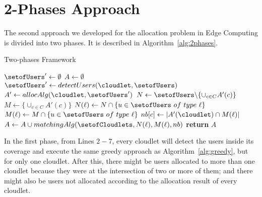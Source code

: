 \documentclass[English]{ic-tese-v3}
\begin{document}
\section{2-Phases Approach}
\label{sec:two_phases}
The second approach we developed for the allocation problem in Edge Computing is divided into two phases. It is described in Algorithm~\ref{alg:2phases}.
\algrenewcommand{}
\begin{algorithm}
    \caption{Two-phases Framework}\label{alg:2phases}
    {\fontsize{8}{8}\selectfont
        \begin{algorithmic}[1]
            \State $\setofUsers' \gets \emptyset$ \hspace{0.5cm} 
            \State $A \gets \emptyset$ \hspace{0.5cm} 
            \For{$\cloudlet \in \setofCloudlets$}
                \State $\setofUsers' \gets  detectUsers(\cloudlet, \setofUsers)$ 
                \State $A' \gets allocAlg(\cloudlet, \setofUsers')$ 
            \EndFor
            \State $N \gets \setofUsers \backslash \{\cup_{c \in C} A'(c)\}$ 
            \State $M \gets \{\cup_{c \in C} A'(c)\}$ 
             
                \State $\displaystyle N(\ell) \gets N \cap \{ u \in \setofUsers\ of \ type \ \ell \}$
                \State $\displaystyle M(\ell) \gets M \cap \{ u \in \setofUsers\ of \ type \ \ell \}$
                    \State $nb[c] \gets |A'(\cloudlet) \cap M(\ell)|$
                \EndFor
                \State $A \gets A \cup matchingAlg(\setofCloudlets, N(\ell), M(\ell), nb) $   
            \EndFor   
            \State \textbf{return} $A$ 
        \EndFunction
        \end{algorithmic}}
\end{algorithm}

In the first phase, from Lines $2-7$, every cloudlet will detect the users inside its coverage and execute the same greedy approach as Algorithm~\ref{alg:greedy}, but for only one cloudlet. After this, there might be users allocated to more than one cloudlet because they were at the intersection of two or more of them; and there might also be users not allocated according to the allocation result of every cloudlet. 
\end{document}

